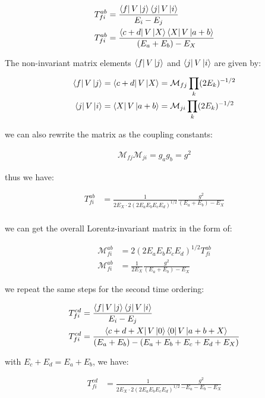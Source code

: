 \documentclass[11pt]{article}
\theoremstyle{definition}
\begin{document}
\begin{align}
    T_{fi}^{ab} &= 
    \frac{\bra{f}V\ket{j}\bra{j}V\ket{i}}
    {E_i-E_j}\\
    T_{fi}^{ab} &= 
    \frac{\bra{c+d}V\ket{X}\bra{X}V\ket{a+b}}
    {(E_a+E_b)-E_X}\\
\end{align}

The non-invariant matrix elements $ \bra{f}V\ket{j}$ and $ \bra{j}V\ket{i}$ are given by:

\begin{align}
    \bra{f}V\ket{j} = \bra{c+d}V\ket{X} &=
    \mathcal{M}_{fj} \prod_k (2E_k)^{-1/2}\\
    \bra{j}V\ket{i} = \bra{X}V\ket{a+b} &=
    \mathcal{M}_{ji} \prod_k (2E_k)^{-1/2}\\
\end{align}

we can also rewrite the matrix as the coupling constants:

\begin{align}
    \mathcal{M}_{fj}\mathcal{M}_{ji} = g_ag_b= g^2
\end{align}

thus we have:

\begin{align}
    T_{fi}^{ab} &= 
    \frac{1}{2E_X \cdot 2(2E_aE_bE_cE_d)^{1/2}}
    \frac{g^2}
    {(E_a+E_b)-E_X}\\
\end{align}

we can get the overall Lorentz-invariant matrix in the form of:

\begin{align}
    \mathcal{M}_{fi}^{ab} &= 2(2E_aE_bE_cE_d)^{1/2} T_{fi}^{ab}\\
    \mathcal{M}_{fi}^{ab} &= \frac{1}{2E_X} \frac{g^2}{(E_a+E_b)-E_X}
\end{align}

we repeat the same steps for the second time ordering:

\begin{align}
    T_{fi}^{cd} &= 
    \frac{\bra{f}V\ket{j}\bra{j}V\ket{i}}
    {E_i-E_j}\\
    T_{fi}^{cd} &= 
    \frac{\bra{c+d+X}V\ket{0}\bra{0}V\ket{a+b+X}}
    {(E_a+E_b)-(E_a+E_b+E_c + E_d + E_X)}\\
\end{align}

with $E_c+E_d = E_a+E_b$, we have:

\begin{align}
    T_{fi}^{cd} &= 
    \frac{1}{2E_X \cdot 2(2E_aE_bE_cE_d)^{1/2}}
    \frac{g^2}
    {-E_a - E_b - E_X}\\
\end{align}
\end{document}
